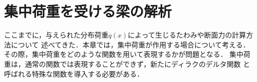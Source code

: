 \documentclass[10pt,a4j]{jbook}
\newlength{\minitwocolumn}
\begin{document}
\newcommand{\fat}[1]{\mbox{\boldmath $#1$}}
\newcommand{\D}{\partial}
\newcommand{\w}{\omega}
\newcommand{\ga}{\alpha}
\newcommand{\gb}{\beta}
\newcommand{\gx}{\xi}
\newcommand{\gz}{\zeta}
\newcommand{\vhat}[1]{\hat{\fat{#1}}}
\newcommand{\spc}{\vspace{0.7\baselineskip}}
\newcommand{\halfspc}{\vspace{0.3\baselineskip}}

\newcommand{\twofig}[2]
 {
   \begin{figure}
     \begin{minipage}[t]{\minitwocolumn}
         \begin{center}   #1
         \end{center}
     \end{minipage}
         \hspace{\columnsep}
     \begin{minipage}[t]{\minitwocolumn}
         \begin{center} #2
         \end{center}
     \end{minipage}
   \end{figure}
 }
\setcounter{chapter}{4}
\chapter{集中荷重を受ける梁の解析}
ここまでに，与えられた分布荷重$q(x)$によって生じるたわみや断面力の計算方法について
述べてきた．本章では，集中荷重が作用する場合について考える．
その際，集中荷重をどのような関数を用いて表現するかが問題となる．
集中荷重は，通常の関数では表現することができず，新たにディラクのデルタ関数
と呼ばれる特殊な関数を導入する必要がある．
\end{document}
